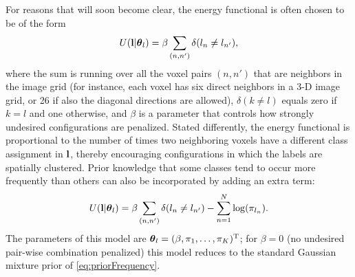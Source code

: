 \documentclass[10pt,twoside]{book}
\begin{document}
For reasons that will soon become clear, the energy functional is often chosen to be of the form
\begin{equation}
  U( \mathbf{l} | {\mbox{\boldmath {${\theta}$}}}_l ) = \beta \sum_{(n,n')} \delta( l_n \neq l_{n'} ),
\end{equation}
where the sum is running over all the voxel pairs $(n,n')$ that are neighbors in the image grid (for instance, each voxel has six direct neighbors in a 3-D image grid, or 26 if also the diagonal directions are allowed), $\delta( k \neq l )$ equals zero if $k = l$ and one otherwise, and $\beta$ is a parameter that controls how strongly undesired configurations are penalized. Stated differently, the energy functional is proportional to the number of times two neighboring voxels have a different class assignment in $\mathbf{l}$, thereby encouraging configurations in which the labels are spatially clustered.
Prior knowledge that some classes tend to occur more frequently than others can also be incorporated by adding an extra term:
\begin{equation}
  U( \mathbf{l} | {\mbox{\boldmath {${\theta}$}}}_l ) = \beta \sum_{(n,n')} \delta( l_n \neq l_{n'} ) -\sum_{n=1}^N \log( \pi_{l_n} ).
  \label{eq:MRFcost}
\end{equation}
The parameters of this model are ${\mbox{\boldmath {${\theta}$}}}_l = ( \beta, \pi_1, \ldots, \pi_K )^\mathrm{T}$; for $\beta=0$ (no undesired pair-wise combination penalized) this model reduces to the standard Gaussian mixture prior of \eqref{eq:priorFrequency}.
\end{document}
